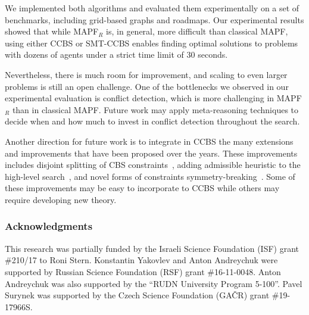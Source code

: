 \documentclass[review]{elsarticle}
\newcommand{\ccbs}{\ac{CCBS}\xspace}
\newcommand{\cbs}{\ac{CBS}\xspace}
\newcommand{\mapfr}{\ac{MAPF}$_R$\xspace}
\newcommand{\smtccbs}{SMT-CCBS\xspace}
\newcommand{\mapf}{\ac{MAPF}\xspace}
\begin{document}
We implemented both algorithms and evaluated them experimentally on a set of benchmarks, including grid-based graphs and roadmaps. Our experimental results showed that while \mapfr is, in general, more difficult than classical \mapf, using either \ccbs or \smtccbs enables finding optimal solutions to problems with dozens of agents under a strict time limit of 30 seconds. 

Nevertheless, there is much room for improvement, and scaling to even larger problems is still an open challenge. 
One of the bottlenecks we observed in our experimental evaluation is conflict detection, which is more challenging in \mapfr than in classical \mapf. Future work may apply meta-reasoning techniques to decide when and how much to invest in conflict detection throughout the search. 

Another direction for future work is to integrate in \ccbs the many extensions and improvements that have been proposed over the years. 
These improvements includes disjoint splitting of \cbs constraints~\cite{li2019disjoint}, adding admissible heuristic to the high-level search~\cite{felner2018adding,li2019improved}, and novel forms of constraints symmetry-breaking~\cite{li2020new}. 
Some of these improvements may be easy to incorporate to \ccbs while others may require developing new theory. 










\subsubsection*{Acknowledgments}
This research was partially funded by the Israeli Science Foundation (ISF) grant \#210/17 to Roni Stern. Konstantin Yakovlev and Anton Andreychuk were supported by Russian Science Foundation (RSF) grant \#16-11-0048. Anton Andreychuk was also supported by the ``RUDN University Program 5-100''. Pavel Surynek was supported by the Czech Science Foundation (GA\v{C}R) grant \#19-17966S.
\end{document}
